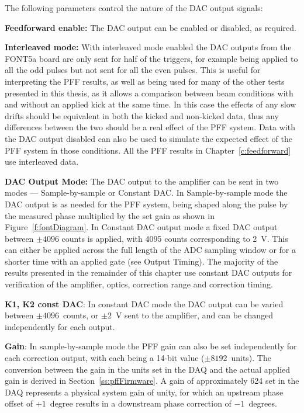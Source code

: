 The following parameters control the nature of the DAC output signals:

\textbf{Feedforward enable:} The DAC output can be enabled or disabled, as required.

\textbf{Interleaved mode:} With interleaved mode enabled the DAC outputs from the FONT5a board are only sent for half of the triggers, for example being applied to all the odd pulses but not sent for all the even pulses. This is useful for interpreting the PFF results, as well as being used for many of the other tests presented in this thesis, as it allows a comparison between beam conditions with and without an applied kick at the same time. In this case the effects of any slow drifts should be equivalent in both the kicked and non-kicked data, thus any differences between the two should be a real effect of the PFF system. Data with the DAC output disabled can also be used to simulate the expected effect of the PFF system in those conditions. All the PFF results in Chapter~\ref{c:feedforward} use interleaved data.

\textbf{DAC Output Mode:} The DAC output to the amplifier can be sent in two modes --- Sample-by-sample or Constant DAC. In Sample-by-sample mode the DAC output is as needed for the PFF system, being shaped along the pulse by the measured phase multiplied by the set gain as shown in Figure~\ref{f:fontDiagram}. 
In Constant DAC output mode a fixed DAC output between \(\pm4096\) counts is applied, with 4095 counts corresponding to 2~V. This can either be applied across the full length of the ADC sampling window or for a shorter time with an applied gate (see Output Timing). 
The majority of the results presented in the remainder of this chapter use constant DAC outputs for verification of the amplifier, optics, correction range and correction timing.

\textbf{K1, K2 const DAC}: In constant DAC mode the DAC output can be varied between \(\pm4096\)~counts, or \(\pm2\)~V sent to the amplifier, and can be changed independently for each output.

\textbf{Gain}: In sample-by-sample mode the PFF gain can also be set independently for each correction output, with each being a 14-bit value (\(\pm8192\)~units). The conversion between the gain in the units set in the DAQ and the actual applied gain is derived in Section~\ref{ss:pffFirmware}. A gain of approximately 624 set in the DAQ represents a physical system gain of unity, for which an upstream phase offset of \(+1\)~degree results in a downstream phase correction of \(-1\)~degrees.

